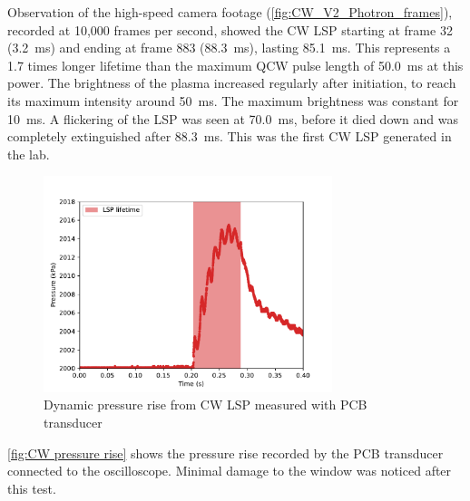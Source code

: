            

            Observation of the high-speed camera footage (\autoref{fig:CW_V2_Photron_frames}), recorded at 10,000 frames per second, showed the CW LSP starting at frame 32 (\qty{3.2}{ms}) and ending at frame 883 (\qty{88.3}{ms}), lasting \qty{85.1}{ms}. This represents a 1.7 times longer lifetime than the maximum QCW pulse length of \qty{50.0}{ms} at this power. The brightness of the plasma increased regularly after initiation, to reach its maximum intensity around \qty{50}{ms}. The maximum brightness was constant for \qty{10}{ms}. A flickering of the LSP was seen at \qty{70.0}{ms}, before it died down and was completely extinguished after \qty{88.3}{ms}. This was the first CW LSP generated in the lab.

            \begin{figure}[!ht]
                \centering
                \includegraphics[width=0.75\textwidth]{assets/4 experiments/CW pressure rise.pdf}
                \caption{Dynamic pressure rise from CW LSP measured with PCB transducer}
                \label{fig:CW pressure rise}
            \end{figure}

            \autoref{fig:CW pressure rise} shows the pressure rise recorded by the PCB transducer connected to the oscilloscope. Minimal damage to the window was noticed after this test.


    
